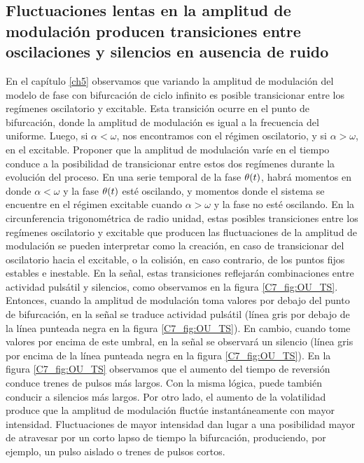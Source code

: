 \documentclass[./main.tex]{subfiles}
\begin{document}
\subsection{Fluctuaciones lentas en la amplitud de modulación producen transiciones entre oscilaciones y silencios en ausencia de ruido}

En el capítulo \ref{ch5} observamos que variando la amplitud de modulación del modelo de fase con bifurcación de ciclo infinito es posible transicionar entre los regímenes oscilatorio y excitable. Esta transición ocurre en el punto de bifurcación, donde la amplitud de modulación es igual a la frecuencia del uniforme. Luego, si $\alpha < \omega$, nos encontramos con el régimen oscilatorio, y si $\alpha > \omega$, en el excitable. Proponer que la amplitud de modulación varíe en el tiempo conduce a la posibilidad de transicionar entre estos dos regímenes durante la evolución del proceso. En una serie temporal de la fase $\theta(t)$, habrá momentos en donde $\alpha < \omega$ y la fase $\theta(t)$ esté oscilando, y momentos donde el sistema se encuentre en el régimen excitable cuando $\alpha > \omega$ y la fase no esté oscilando. En la circunferencia trigonométrica de radio unidad, estas posibles transiciones entre los regímenes oscilatorio y excitable que producen las fluctuaciones de la amplitud de modulación se pueden interpretar como la creación, en caso de transicionar del oscilatorio hacia el excitable, o la colisión, en caso contrario, de los puntos fijos estables e inestable. En la señal, estas transiciones reflejarán combinaciones entre actividad pulsátil y silencios, como observamos en la figura \ref{C7_fig:OU_TS}. Entonces, cuando la amplitud de modulación toma valores por debajo del punto de bifurcación, en la señal se traduce actividad pulsátil (línea gris por debajo de la línea punteada negra en la figura \ref{C7_fig:OU_TS}). En cambio, cuando tome valores por encima de este umbral, en la señal se observará un silencio (línea gris por encima de la línea punteada negra en la figura \ref{C7_fig:OU_TS}). En la figura \ref{C7_fig:OU_TS} observamos que el aumento del tiempo de reversión conduce trenes de pulsos más largos. Con la misma lógica, puede también conducir a silencios más largos. Por otro lado, el aumento de la volatilidad produce que la amplitud de modulación fluctúe instantáneamente con mayor intensidad. Fluctuaciones de mayor intensidad dan lugar a una posibilidad mayor de atravesar por un corto lapso de tiempo la bifurcación, produciendo, por ejemplo, un pulso aislado o trenes de pulsos cortos.
\end{document}

